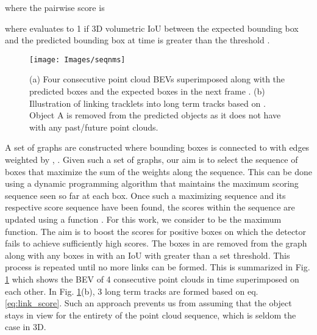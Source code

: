 \documentclass[10pt,twocolumn,letterpaper]{article}
\begin{document}
where the pairwise score is

where  evaluates to 1 if 3D volumetric IoU between the expected bounding box and the predicted bounding box at time  is greater than the threshold .
\begin{figure}[t]
   \begin{center}
   \texttt{[image: Images/seqnms]}
   \end{center}
      \caption{(a) Four consecutive point cloud BEVs superimposed along with the predicted boxes  and the expected boxes in the next frame . (b) Illustration of linking tracklets into long term tracks based on . Object A is removed from the predicted objects as it does not have  with any past/future point clouds.}
   \label{fig:seqnms}
\end{figure}

A set of graphs are constructed where bounding boxes  is connected to  with edges weighted by , . Given such a set of graphs, our aim is to select the sequence of boxes that maximize the sum of the weights along the sequence. This can be done using a dynamic programming algorithm that maintains the maximum scoring sequence seen so far at each box. Once such a maximizing sequence  and its respective score sequence  have been found, the scores within the sequence are updated using a function . For this work, we consider  to be the maximum function. The aim is to boost the scores for positive boxes on which the detector fails to achieve sufficiently high scores. The boxes in  are removed from the graph along with any boxes in  with an IoU with  greater than a set threshold. This process is repeated until no more links can be formed. This is summarized in Fig. \ref{fig:seqnms} which shows the BEV of 4 consecutive point clouds in time superimposed on each other. In Fig. \ref{fig:seqnms}(b), 3 long term tracks are formed based on eq. \ref{eq:link_score}. Such an approach prevents us from assuming that the object stays in view for the entirety of the point cloud sequence, which is seldom the case in 3D.
\end{document}

